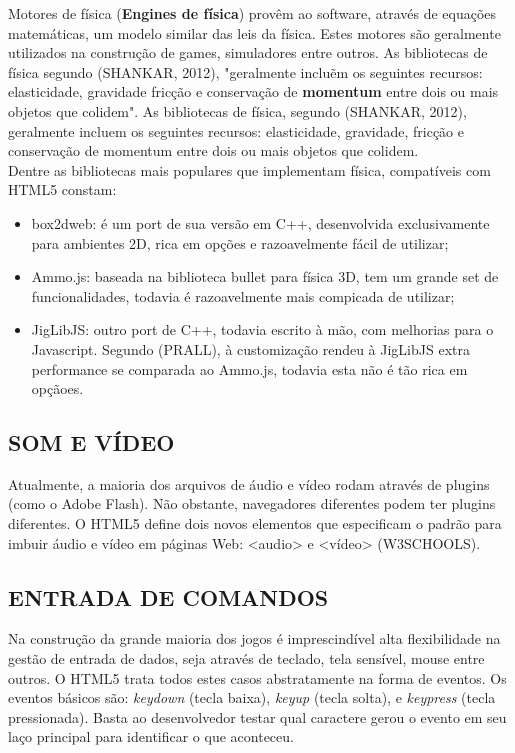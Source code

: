 \documentclass{article}
\begin{document}
Motores de física (\textbf{Engines de física}) provêm ao software, através de equações matemáticas, um modelo similar das leis da física. Estes motores são geralmente utilizados na construção de games, simuladores entre outros. As bibliotecas de física segundo (SHANKAR, 2012), "geralmente incluẽm os seguintes recursos: elasticidade, gravidade fricção e conservação de \textbf{momentum} entre dois ou mais objetos que colidem". As bibliotecas de física, segundo (SHANKAR, 2012), geralmente incluem os seguintes recursos: elasticidade, gravidade, fricção e conservação de momentum entre dois ou mais objetos que colidem.
\\
Dentre as bibliotecas mais populares que implementam física, compatíveis com HTML5 constam:


\begin{itemize}
    \item box2dweb: é um port de sua versão em C++, desenvolvida exclusivamente para ambientes 2D, rica em opções e razoavelmente fácil de utilizar;
    \item Ammo.js: baseada na biblioteca bullet para física 3D, tem um grande set de funcionalidades, todavia é razoavelmente mais compicada de utilizar;

    \item JigLibJS: outro port de C++, todavia escrito à mão, com melhorias para o Javascript.  Segundo (PRALL), à customização rendeu à JigLibJS extra performance se comparada ao Ammo.js, todavia esta não é tão rica em opçãoes.
\end{itemize}


\subsection{SOM E VÍDEO}

Atualmente, a maioria dos arquivos de áudio e vídeo rodam através de plugins (como o Adobe Flash). Não obstante, navegadores diferentes podem ter plugins diferentes. O HTML5 define dois novos elementos que especificam o padrão para imbuir áudio e vídeo em páginas Web: <audio> e <vídeo> (W3SCHOOLS).


\subsection{ENTRADA DE COMANDOS}


Na construção da grande maioria dos jogos é imprescindível alta flexibilidade na gestão de entrada de dados, seja através de teclado, tela sensível, mouse entre outros. O HTML5 trata todos estes casos abstratamente na forma de eventos. Os eventos básicos são: \textit{keydown} (tecla baixa), \textit{keyup} (tecla solta), e \textit{keypress} (tecla pressionada). Basta ao desenvolvedor testar qual caractere gerou o evento em seu laço principal para identificar o que aconteceu.
\end{document}
